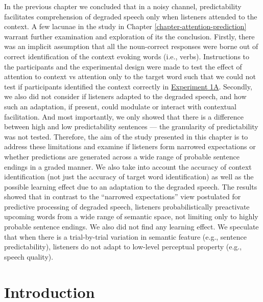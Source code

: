 \documentclass[a4paper, nobind]{templates/ociamthesis}
\begin{document}
In the previous chapter we concluded that in a noisy channel, predictability facilitates comprehension of degraded speech only when listeners attended to the context.
A few lacunae in the study in Chapter \ref{chapter-attention-prediction} warrant further examination and exploration of its the conclusion.
Firstly, there was an implicit assumption that all the noun-correct responses were borne out of correct identification of the context evoking words (i.e., verbs).
Instructions to the participants and the experimental design were made to test the effect of attention to context vs attention only to the target word such that
we could not test if participants identified the context correctly in \protect\hyperlink{experiment1a}{Experiment 1A}.
Secondly, we also did not consider if listeners adapted to the degraded speech, and how such an adaptation, if present, could modulate or interact with contextual facilitation.
And most importantly, we only showed that there is a difference between high and low predictability sentences ---
the granularity of predictability was not tested.
Therefore, the aim of the study presented in this chapter is to address these limitations and examine if listeners form narrowed expectations or whether predictions are generated across a wide range of probable sentence endings in a graded manner.
We also take into account the accuracy of context identification (not just the accuracy of target word identification) as well as the possible learning effect due to an adaptation to the degraded speech.
The results showed that in contrast to the ``narrowed expectations'' view postulated for predictive processing of degraded speech,
listeners probabilistically preactivate upcoming words from a wide range of semantic space, not limiting only to highly probable sentence endings.
We also did not find any learning effect.
We speculate that when there is a trial-by-trial variation in semantic feature (e.g., sentence predictability), listeners do not adapt to low-level perceptual property (e.g., speech quality).

\hypertarget{introduction-1}{%
\section{Introduction}\label{introduction-1}}
\end{document}
